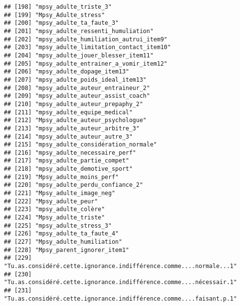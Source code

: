 \documentclass[
]{article}
\begin{document}
\begin{verbatim}
## [198] "mpsy_adulte_triste_3"                                              
## [199] "Mpsy_Adulte_stress"                                                
## [200] "mpsy_adulte_ta_faute_3"                                            
## [201] "mpsy_adulte_ressenti_humuliation"                                  
## [202] "mpsy_adulte_humiliation_autrui_item9"                              
## [203] "mpsy_adulte_limitation_contact_item10"                             
## [204] "mpsy_adulte_jouer_blesser_item11"                                  
## [205] "mpsy_adulte_entrainer_a_vomir_item12"                              
## [206] "mpsy_adulte_dopage_item13"                                         
## [207] "mpsy_adulte_poids_ideal_item13"                                    
## [208] "mpsy_adulte_auteur_entraineur_2"                                   
## [209] "mpsy_adulte_auteur_assist_coach"                                   
## [210] "mpsy_adulte_auteur_prepaphy_2"                                     
## [211] "mpsy_adulte_equipe_medical"                                        
## [212] "Mpsy_adulte_auteur_psychologue"                                    
## [213] "mpsy_adulte_auteur_arbitre_3"                                      
## [214] "mpsy_adulte_auteur_autre_3"                                        
## [215] "mpsy_adulte_considération_normale"                                 
## [216] "mpsy_adulte_necessaire_perf"                                       
## [217] "mpsy_adulte_partie_compet"                                         
## [218] "mpsy_adulte_demotive_sport"                                        
## [219] "Mpsy_adulte_moins_perf"                                            
## [220] "mpsy_adulte_perdu_confiance_2"                                     
## [221] "Mpsy_adulte_image_neg"                                             
## [222] "Mpsy_adulte_peur"                                                  
## [223] "mpsy_adulte_colère"                                                
## [224] "Mpsy_adulte_triste"                                                
## [225] "mpsy_adulte_stress_3"                                              
## [226] "mpsy_adulte_ta_faute_4"                                            
## [227] "Mpsy_adulte_humiliation"                                           
## [228] "Mpsy_parent_ignorer_item1"                                         
## [229] "Tu.as.considéré.cette.ignorance.indifférence.comme....normale...1" 
## [230] "Tu.as.considéré.cette.ignorance.indifférence.comme....nécessair.1" 
## [231] "Tu.as.considéré.cette.ignorance.indifférence.comme....faisant.p.1" 

\end{verbatim}
\end{document}
